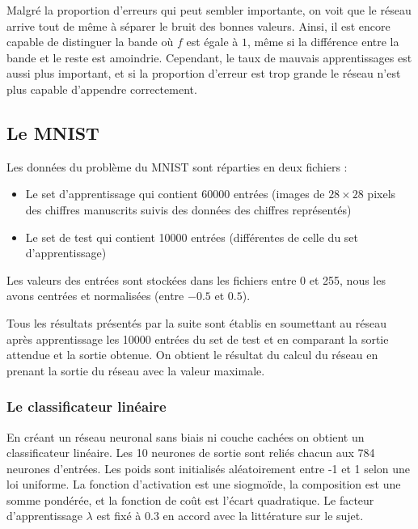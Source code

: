 Malgré la proportion d'erreurs qui peut sembler importante, on voit que le réseau arrive tout de même à séparer le bruit des bonnes valeurs. Ainsi, il est encore capable de distinguer la bande où $f$ est égale à $1$, même si la différence entre la bande et le reste est amoindrie. Cependant, le taux de mauvais apprentissages est aussi plus important, et si la proportion d'erreur est trop grande le réseau n'est plus capable d'appendre correctement.


\subsection{Le MNIST}

Les données du problème du MNIST sont réparties en deux fichiers :
\begin{itemize}
    \item Le set d'apprentissage qui contient 60000 entrées (images de $28 \times 28$ pixels
          des chiffres manuscrits suivis des données des chiffres représentés)
    \item Le set de test qui contient 10000 entrées (différentes de celle du set
          d'apprentissage)
\end{itemize}

\medskip

Les valeurs des entrées sont stockées dans les fichiers entre 0 et 255, nous
les avons centrées et normalisées (entre $-0.5$ et $0.5$).

\medskip

Tous les résultats présentés par la suite sont établis en soumettant au réseau
après apprentissage les 10000 entrées du set de test et en comparant la sortie
attendue et la sortie obtenue. On obtient le résultat du calcul du réseau en
prenant la sortie du réseau avec la valeur maximale.

\subsubsection{Le classificateur linéaire}

En créant un réseau neuronal sans biais ni couche cachées on obtient un
classificateur linéaire. Les 10 neurones de sortie sont reliés chacun aux 784
neurones d'entrées. Les poids sont initialisés aléatoirement entre -1 et 1 selon
 une loi uniforme. La fonction d'activation est une siogmoïde, la composition
est une somme pondérée, et la fonction de coût est l'écart quadratique. Le
facteur d'apprentissage $\lambda$ est fixé à $0.3$ en accord avec la littérature
 sur le sujet.

